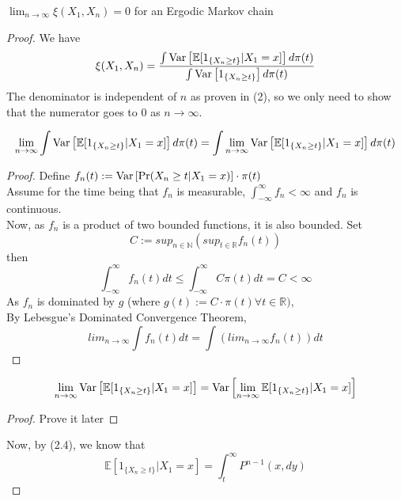 \begin{theorem}
    $\lim_{n \rightarrow \infty} \xi(X_1, X_{n}) = 0$ for an Ergodic Markov chain
    \begin{proof}
        We have
        \begin{equation*}
            \xi(X_1, X_{n}) = \frac{\int \text{Var}\left[{{\mathbb{E}[1_{\{X_{n} \geq t\}}|X_1=x]}}\right] d\pi(t)}{\int \text{Var}\left[{{1_{\{X_{n} \geq t\}}}}\right] d\pi(t)}
        \end{equation*}
        The denominator is independent of $n$ as proven in (2), so we only need to show that the numerator goes to 0 as $n \rightarrow \infty$.\\
        \begin{lem}
            $$\lim_{n \rightarrow \infty} \int \text{Var}\left[{{\mathbb{E}[1_{\{X_{n} \geq t\}}|X_1=x]}}\right] d\pi(t) = \int \lim_{n \rightarrow \infty}\text{Var}\left[{{\mathbb{E}[1_{\{X_{n} \geq t\}}|X_1=x]}}\right] d\pi(t)$$
            \begin{proof}
                Define $f_n(t) := \text{Var}\left[{{\Pr(X_{n} \geq t | X_{1} = x)}}\right] \cdot \pi(t) $ \\
                Assume for the time being that $f_n$ is measurable, $\int_{-\infty}^{\infty} f_n < \infty$ and $f_n$ is continuous.\\
                Now, as $f_n$ is a product of two bounded functions, it is also bounded.
                Set
                $$ C:= sup_{n \in \mathbb{N}} (sup_{t \in \mathbb{R}}f_n(t))$$
                then
                $$\int_{-\infty}^{\infty} f_n(t)dt \leq \int_{-\infty}^{\infty} C\pi(t)dt = C < \infty$$
                As $f_n$ is dominated by $g$ (where $g(t) := C\cdot\pi(t) \forall t \in \mathbb{R})$, \\
                By Lebesgue's Dominated Convergence Theorem,
                $$lim_{n \rightarrow \infty} \int f_n(t) dt = \int (lim_{n \rightarrow \infty} f_n(t)) dt$$
            \end{proof}
        \end{lem}
        \begin{lem}
            $$\lim_{n \rightarrow \infty} \text{Var}\left[{{\mathbb{E}[1_{\{X_{n} \geq t\}}|X_1=x]}}\right] = \text{Var}\left[{{\lim_{n \rightarrow \infty} \mathbb{E}[1_{\{X_{n} \geq t\}}|X_1=x]}}\right]$$
            \begin{proof}
                Prove it later
            \end{proof}
        \end{lem}
        Now, by (2.4), we know that
        \begin{equation*}
            \mathbb{E}[1_{\{X_{n} \geq t\}}|X_1=x] = \int_t^{\infty} P^{n-1}(x, dy)

\end{equation*}
\end{proof}
\end{theorem}
